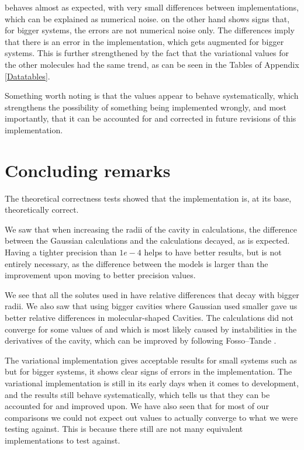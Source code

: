 \documentclass[../master_thesis.tex]{subfiles}
\begin{document}
 behaves almost as expected, with very small differences between implementations,
which can be explained as numerical noise.  on the other hand shows signs that,
for bigger systems, the errors are not numerical noise only. The  differences imply
that there is an error in the implementation, which gets augmented for bigger systems.
This is further strengthened by the fact that the variational values for the other
molecules had the same trend, as can be seen in the Tables of Appendix \ref{Datatables}.

Something worth noting is that the values appear to behave systematically,
which strengthens the possibility of something being implemented wrongly, and most
importantly, that it can be accounted for and corrected in future revisions of
this implementation.

\section{Concluding remarks}
The theoretical correctness tests showed that the implementation is, at its base,
theoretically correct.

We saw that when increasing the radii of the cavity in calculations, the difference
between the Gaussian calculations and the \mrchem calculations decayed, as is
expected.
Having a tighter precision than $1e-4$ helps to have better results, but is not entirely
necessary, as the difference between the models is larger than the improvement upon
moving to better precision values.

We see that all the solutes used in \cite{Chipman2002} have relative differences that
decay with bigger radii. We also saw that using bigger \mrchem cavities where Gaussian
used smaller gave us better relative differences in molecular-shaped Cavities.
The \mrchem calculations did not converge for some values of  and 
which is most likely caused by instabilities in the derivatives of the cavity, which
can be improved by following Fosso--Tande \cite{FossoTande:2013ka}.

The variational implementation gives acceptable results for small systems such
as  but for bigger systems, it shows clear signs of errors in the implementation.
The variational implementation is still in its early days when it comes to development,
and the results still behave systematically, which tells us that they can be accounted for and
improved upon.
We have also seen that for most of our comparisons we could not expect out values to actually
converge to what we were testing against. This is because there still are not many
equivalent implementations to test against.
\end{document}
